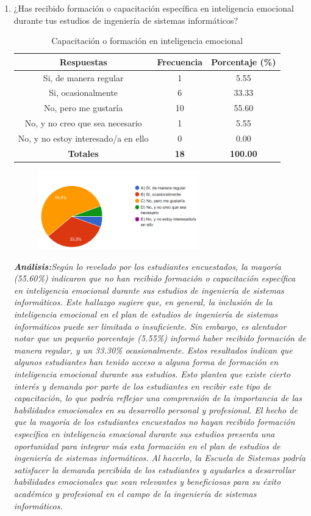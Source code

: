 \documentclass[journal]{IEEEtran}
\begin{document}
\begin{enumerate}
\item ¿Has recibido formación o capacitación específica en inteligencia emocional durante tus estudios de ingeniería de sistemas informáticos?
	\begin{table}[H]
		\renewcommand{\arraystretch}{1.3}
		\centering
		\caption{Capacitación o formación en inteligencia emocional}
		\begin{tabular}{c c c}
			\hline
			\textbf{Respuestas} & \textbf{Frecuencia} & \textbf{Porcentaje (\%)}\\
			\hline
			Si, de manera regular & 1 & 5.55 \\
			Si, ocasionalmente & 6 & 33.33 \\
			No, pero me gustaría & 10 & 55.60\\
			No, y no creo que sea necesario & 1 & 5.55\\
			No, y no estoy interesado/a en ello & 0 & 0.00\\
			\hline
			\textbf{Totales} &\textbf{18}& \textbf{100.00}\\
			\hline
		\end{tabular}
	\end{table}
	\begin{figure}[h]
		\centering
		\includegraphics[width=07cm]{Pregunta 6}
	\end{figure}
	\textit{\textbf{Análisis:}Según lo revelado por los estudiantes encuestados, la mayoría (55.60\%) indicaron que no han recibido formación o capacitación específica en inteligencia emocional durante sus estudios de ingeniería de sistemas informáticos. Este hallazgo sugiere que, en general, la inclusión de la inteligencia emocional en el plan de estudios de ingeniería de sistemas informáticos puede ser limitada o insuficiente.
Sin embargo, es alentador notar que un pequeño porcentaje (5.55\%) informó haber recibido formación de manera regular, y un 33.30\% ocasionalmente. Estos resultados indican que algunos estudiantes han tenido acceso a alguna forma de formación en inteligencia emocional durante sus estudios. Esto plantea que existe cierto interés y demanda por parte de los estudiantes en recibir este tipo de capacitación, lo que podría reflejar una comprensión de la importancia de las habilidades emocionales en su desarrollo personal y profesional.
El hecho de que la mayoría de los estudiantes encuestados no hayan recibido formación específica en inteligencia emocional durante sus estudios presenta una oportunidad para integrar más esta formación en el plan de estudios de ingeniería de sistemas informáticos. Al hacerlo, la Escuela de Sistemas podría satisfacer la demanda percibida de los estudiantes y ayudarles a desarrollar habilidades emocionales que sean relevantes y beneficiosas para su éxito académico y profesional en el campo de la ingeniería de sistemas informáticos.
}\\


\end{enumerate}
\end{document}
